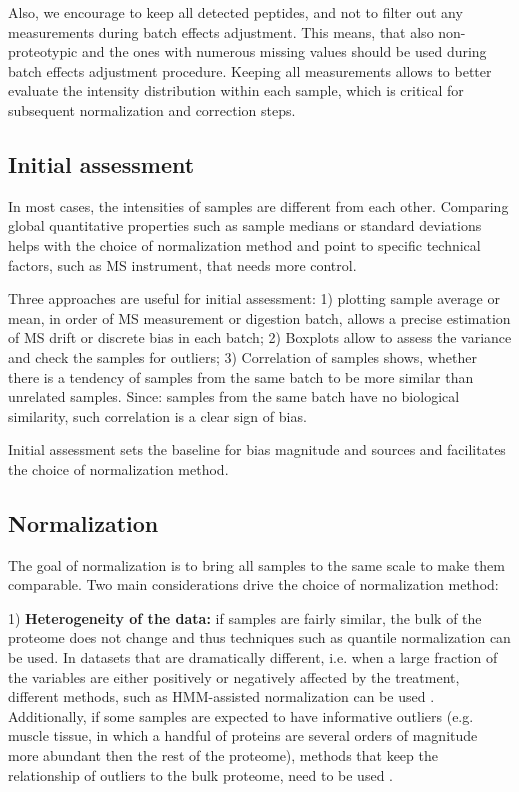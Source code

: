 \documentclass[num-refs]{wiley-article}
\begin{document}
Also, we encourage to keep all detected peptides, and not to filter out any measurements during batch effects adjustment. This means, that also non-proteotypic and the ones with numerous missing values should be used during batch effects adjustment procedure. Keeping all measurements allows to better evaluate the intensity distribution within each sample, which is critical for subsequent normalization and correction steps. 

\subsection{Initial assessment}
In most cases, the intensities of samples are different from each other. Comparing global quantitative properties such as sample medians or standard deviations helps with the choice of normalization method and point to specific technical factors, such as MS instrument, that needs more control. 

Three approaches are useful for initial assessment: 1) plotting sample average or mean, in order of MS measurement or digestion batch, allows a precise estimation of MS drift or discrete bias in each batch; 2) Boxplots allow to assess the variance and check the samples for outliers; 3) Correlation of samples shows, whether there is a tendency of samples from the same batch to be more similar than unrelated samples. Since: samples from the same batch have no biological similarity, such correlation is a clear sign of bias.

Initial assessment sets the baseline for bias magnitude and sources and facilitates the choice of normalization method.

\subsection{Normalization}

The goal of normalization is to bring all samples to the same scale to make them comparable. Two main considerations drive the choice of normalization method: 

1) \textbf{Heterogeneity of the data: }if samples are fairly similar, the bulk of the proteome does not change and thus techniques such as quantile normalization \cite{Bolstad2003} can be used. In datasets that are dramatically different, i.e. when a large fraction of the variables are either positively or negatively affected by the treatment, different methods, such as HMM-assisted normalization can be used \cite{Landfors2011}. Additionally, if some samples are expected to have informative outliers (e.g. muscle tissue, in which a handful of proteins are several orders of magnitude more abundant then the rest of the proteome), methods that keep the relationship of outliers to the bulk proteome, need to be used \cite{Wang770115}.
\end{document}
